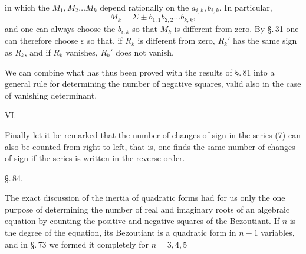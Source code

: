 in which the $M_1, M_2 \ldots M_k$ depend rationally on the $a_{i,k}, b_{i,k}$. In particular,
\[
M_k = \Sigma \pm b_{1,1} b_{2,2} \ldots b_{k,k},
\]
and one can always choose the $b_{i,k}$ so that $M_k$ is different from zero. By \S.\,31 one can therefore choose $\varepsilon$ so that, if $R_k$ is different from zero, $R_k'$ has the same sign as $R_k$, and if $R_k$ vanishes, $R_k'$ does not vanish.

We can combine what has thus been proved with the results of \S.\,81 into a general rule for determining the number of negative squares, valid also in the case of vanishing determinant.

VI. 

Finally let it be remarked that the number of changes of sign in the series (7) can also be counted from right to left, that is, one finds the same number of changes of sign if the series is written in the reverse order.

\begin{center}
\S.\,84.

\end{center}

The exact discussion of the inertia of quadratic forms had for us only the one purpose of determining the number of real and imaginary roots of an algebraic equation by counting the positive and negative squares of the Bezoutiant. If $n$ is the degree of the equation, its Bezoutiant is a quadratic form in $n - 1$ variables, and in \S.\,73 we formed it completely for $n = 3, 4, 5$
